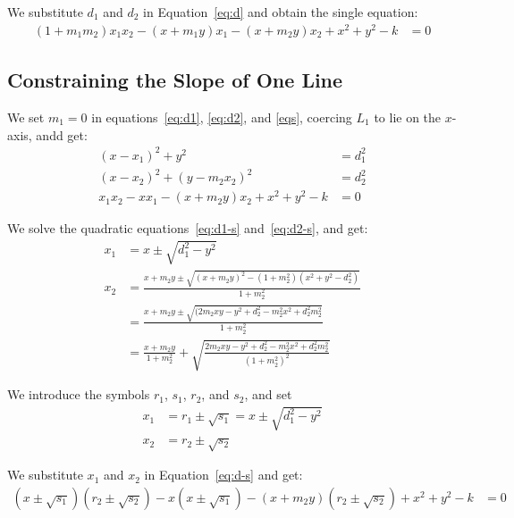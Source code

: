 \noindent
We substitute $d_1$ and $d_2$ in Equation~\ref{eq:d} and obtain the single equation:
\begin{align}
  (1 + m_1 m_2) x_1 x_2 - (x + m_1 y) x_1 - (x + m_2 y) x_2 + x^2 + y^2 - k &= 0\label{eqs}
\end{align}

\subsection{Constraining the Slope of One Line}
\label{ssec:derivation-constraining-slope}
We set $m_1 = 0$ in equations~\ref{eq:d1}, \ref{eq:d2}, and \ref{eqs}, coercing $L_1$ to lie on the $x$-axis, andd get:
\begin{align}
  (x - x_1)^2 + y^2 & = d_1^2\label{eq:d1-s}\\
  (x - x_2)^2 + (y - m_2 x_2)^2 & = d_2^2\label{eq:d2-s}\\
  x_1 x_2 - x x_1 - (x + m_2 y) x_2 + x^2 + y^2 - k &= 0\label{eq:d-s}
\end{align}

\noindent
We solve the quadratic equations~\ref{eq:d1-s} and~\ref{eq:d2-s}, and get:
\begin{align*}
  x_1 &= x \pm \sqrt{d_1^2 - y^2}\\
  x_2 &= \frac{x + m_2 y \pm \sqrt{(x + m_2 y)^2 - (1 + m_2^2)(x^2 + y^2 - d_2^2)}}{1 + m_2^2}\\
  &= \frac{x + m_2 y \pm \sqrt{(2 m_2 x y - y^2 + d_2^2 - m_2^2 x^2 + d_2^2 m_2^2}}{1 + m_2^2}\\
  &= \frac{x + m_2 y}{1 + m_2^2} + \sqrt{\frac{2 m_2 x y - y^2 + d_2^2 - m_2^2 x^2 + d_2^2 m_2^2}{(1 + m_2^2)^2}}
\end{align*}

\noindent
We introduce the symbols $r_1$, $s_1$, $r_2$, and $s_2$, and set
\begin{align*}
  x_1 &= r_1 \pm \sqrt{s_1} = x \pm \sqrt{d_1^2 - y^2}\\
  x_2 &= r_2 \pm \sqrt{s_2}
\end{align*}

\noindent
We substitute $x_1$ and $x_2$ in Equation~\ref{eq:d-s} and get:
\begin{align*}
  (x \pm \sqrt{s_1}) (r_2 \pm \sqrt{s_2}) - x (x \pm \sqrt{s_1}) - (x + m_2 y) (r_2 \pm \sqrt{s_2}) + x^2 + y^2 - k &= 0\\
\end{align*}

